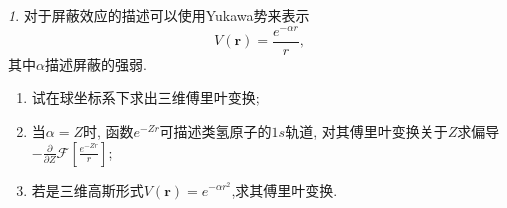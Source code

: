 \documentclass[11pt]{article}
\theoremstyle{remark}
\newtheorem{problem}{}
\begin{document}
\begin{problem}
    对于屏蔽效应的描述可以使用Yukawa势来表示
$$
V(\mathbf{r}) = \frac{e^{-\alpha r}}{r},
$$
其中$\alpha$描述屏蔽的强弱.
\begin{enumerate}
  \item 试在球坐标系下求出三维傅里叶变换;
  \item 当$\alpha=Z$时, 函数$e^{-Zr}$可描述类氢原子的$1s$轨道, 对其傅里叶变换关于$Z$求偏导
  $-\frac{\partial}{\partial Z} \mathcal{F} \left[ \frac{e^{-Z r}}{r}\right]$;
  \item 若是三维高斯形式$V(\mathbf{r}) = e^{-\alpha r^2}$,求其傅里叶变换.
\end{enumerate}
\end{problem}
  
\end{document}

